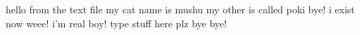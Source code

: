 hello from the text file
my cat name is mushu
my other is called poki
bye!
i exist now weee!
i'm real boy!
type stuff here plz
bye bye!

